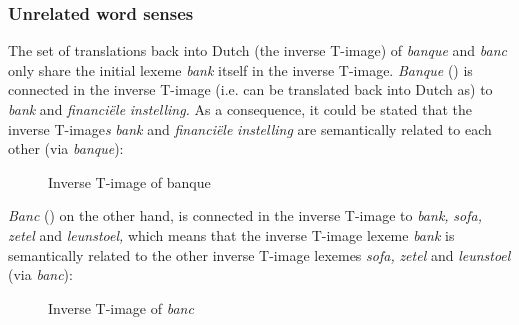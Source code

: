 \subsubsection{Unrelated word senses}
\label{sec:3.4.3.1}
The set of translations back into Dutch (the inverse T-image) of \textit{banque} and \textit{banc} only share the initial lexeme \textit{bank} itself in the inverse T-image. \textit{Banque} () is connected in the inverse T-image (i.e. can be translated back into Dutch as) to \textit{bank} and \textit{financiële} \textit{instelling.} As a consequence, it could be stated that the inverse T-image\textit{s} \textit{bank} and \textit{financiële} \textit{instelling} are semantically related to each other (via \textit{banque}):

\begin{figure}
\caption{\label{fig:3:10}{Inverse} {T-image} {of} {banque}}
\end{figure}

\textit{Banc} () on the other hand, is connected in the inverse T-image to \textit{bank,} \textit{sofa,} \textit{zetel} and \textit{leunstoel,} which means that the inverse T-image lexeme \textit{bank} is semantically related to the other inverse T-image lexemes \textit{sofa,} \textit{zetel} and \textit{leunstoel} (via \textit{banc}):

\begin{figure}
\caption{\label{fig:3:11}Inverse T-image of \textit{banc}}
\end{figure}

